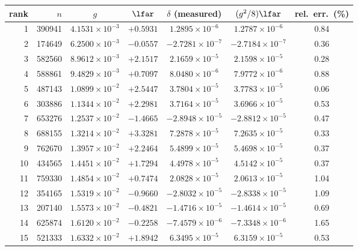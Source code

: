\begin{tabular}{@{}rrccccc@{}}
\toprule
rank & $n$ & $g$ & $\lfar$ & $\delta$ (measured) & $(g^{2}/8)\lfar$ & rel.\ err.\ (\%)\\
\midrule
1 & 390941 & $4.1531\times10^{-3}$ & $+0.5931$ & $1.2895\times10^{-6}$ & $1.2787\times10^{-6}$ & 0.84\\
2 & 174649 & $6.2500\times10^{-3}$ & $-0.0557$ & $-2.7281\times10^{-7}$ & $-2.7184\times10^{-7}$ & 0.36\\
3 & 582560 & $8.9612\times10^{-3}$ & $+2.1517$ & $2.1659\times10^{-5}$ & $2.1598\times10^{-5}$ & 0.28\\
4 & 588861 & $9.4829\times10^{-3}$ & $+0.7097$ & $8.0480\times10^{-6}$ & $7.9772\times10^{-6}$ & 0.88\\
5 & 487143 & $1.0899\times10^{-2}$ & $+2.5447$ & $3.7804\times10^{-5}$ & $3.7783\times10^{-5}$ & 0.06\\
6 & 303886 & $1.1344\times10^{-2}$ & $+2.2981$ & $3.7164\times10^{-5}$ & $3.6966\times10^{-5}$ & 0.53\\
7 & 653276 & $1.2537\times10^{-2}$ & $-1.4665$ & $-2.8948\times10^{-5}$ & $-2.8812\times10^{-5}$ & 0.47\\
8 & 688155 & $1.3214\times10^{-2}$ & $+3.3281$ & $7.2878\times10^{-5}$ & $7.2635\times10^{-5}$ & 0.33\\
9 & 762670 & $1.3957\times10^{-2}$ & $+2.2464$ & $5.4899\times10^{-5}$ & $5.4698\times10^{-5}$ & 0.37\\
10 & 434565 & $1.4451\times10^{-2}$ & $+1.7294$ & $4.4978\times10^{-5}$ & $4.5142\times10^{-5}$ & 0.37\\
11 & 759330 & $1.4854\times10^{-2}$ & $+0.7474$ & $2.0828\times10^{-5}$ & $2.0613\times10^{-5}$ & 1.04\\
12 & 354165 & $1.5319\times10^{-2}$ & $-0.9660$ & $-2.8032\times10^{-5}$ & $-2.8338\times10^{-5}$ & 1.09\\
13 & 207140 & $1.5573\times10^{-2}$ & $-0.4821$ & $-1.4716\times10^{-5}$ & $-1.4614\times10^{-5}$ & 0.69\\
14 & 625874 & $1.6120\times10^{-2}$ & $-0.2258$ & $-7.4579\times10^{-6}$ & $-7.3348\times10^{-6}$ & 1.65\\
15 & 521333 & $1.6332\times10^{-2}$ & $+1.8942$ & $6.3495\times10^{-5}$ & $6.3159\times10^{-5}$ & 0.53\\
\bottomrule
\end{tabular}
